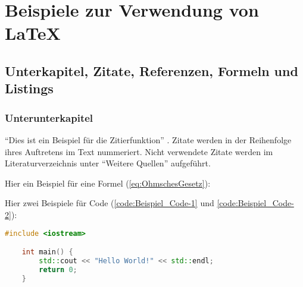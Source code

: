 


\chapter{Beispiele zur Verwendung von LaTeX}
   
\section{Unterkapitel, Zitate, Referenzen, Formeln und Listings}\label{sec:Unterkapitel}

\subsection{Unterunterkapitel}

\enquote{Dies ist ein Beispiel für die Zitierfunktion} \cite[Vgl.][S. 1 ff.]{2024}. Zitate werden in der Reihenfolge ihres Auftretens im Text nummeriert. Nicht verwendete Zitate werden im Literaturverzeichnis unter \enquote{Weitere Quellen} aufgeführt.


Hier ein Beispiel für eine Formel (\autoref{eq:OhmschesGesetz}):

Hier zwei Beispiele für Code (\autoref{code:Beispiel_Code-1} und \autoref{code:Beispiel_Code-2}):

\begin{lstlisting}[language=C++, caption={Beispiel: direktes einfügen von Code}, label={code:Beispiel_Code-1}]
    #include <iostream>

    int main() {
        std::cout << "Hello World!" << std::endl;
        return 0;
    }
\end{lstlisting}



